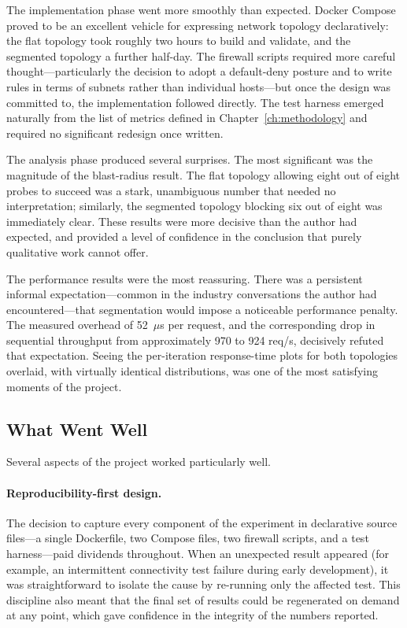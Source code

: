 The implementation phase went more smoothly than expected. Docker Compose proved to be an excellent vehicle for expressing network topology declaratively: the flat topology took roughly two hours to build and validate, and the segmented topology a further half-day. The firewall scripts required more careful thought---particularly the decision to adopt a default-deny posture and to write rules in terms of subnets rather than individual hosts---but once the design was committed to, the implementation followed directly. The test harness emerged naturally from the list of metrics defined in Chapter~\ref{ch:methodology} and required no significant redesign once written.

The analysis phase produced several surprises. The most significant was the magnitude of the blast-radius result. The flat topology allowing eight out of eight probes to succeed was a stark, unambiguous number that needed no interpretation; similarly, the segmented topology blocking six out of eight was immediately clear. These results were more decisive than the author had expected, and provided a level of confidence in the conclusion that purely qualitative work cannot offer.

The performance results were the most reassuring. There was a persistent informal expectation---common in the industry conversations the author had encountered---that segmentation would impose a noticeable performance penalty. The measured overhead of 52~$\mu$s per request, and the corresponding drop in sequential throughput from approximately 970 to 924 req/s, decisively refuted that expectation. Seeing the per-iteration response-time plots for both topologies overlaid, with virtually identical distributions, was one of the most satisfying moments of the project.

\subsection{What Went Well}

Several aspects of the project worked particularly well.

\paragraph{Reproducibility-first design.} The decision to capture every component of the experiment in declarative source files---a single Dockerfile, two Compose files, two firewall scripts, and a test harness---paid dividends throughout. When an unexpected result appeared (for example, an intermittent connectivity test failure during early development), it was straightforward to isolate the cause by re-running only the affected test. This discipline also meant that the final set of results could be regenerated on demand at any point, which gave confidence in the integrity of the numbers reported.

